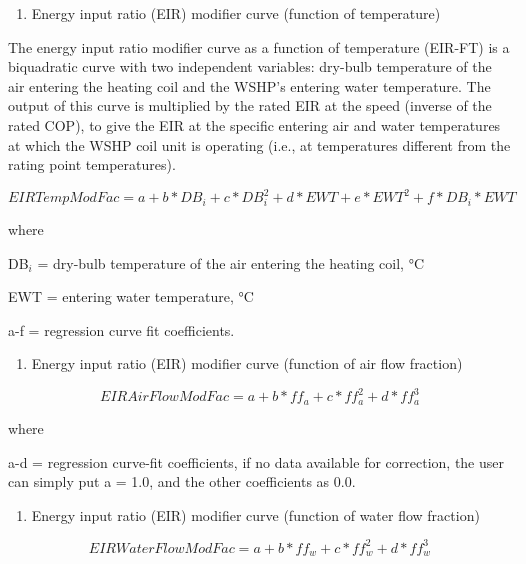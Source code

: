 \begin{enumerate}
\def\labelenumi{\arabic{enumi})}
\setcounter{enumi}{3}
\tightlist
\item
  Energy input ratio (EIR) modifier curve (function of temperature)
\end{enumerate}

The energy input ratio modifier curve as a function of temperature (EIR-FT) is a biquadratic curve with two independent variables: dry-bulb temperature of the air entering the heating coil and the WSHP's entering water temperature. The output of this curve is multiplied by the rated EIR at the speed (inverse of the rated COP), to give the EIR at the specific entering air and water temperatures at which the WSHP coil unit is operating (i.e., at temperatures different from the rating point temperatures).

\begin{equation}
EIRTempModFac = a + b*D{B_i} + c*DB_i^2 + d*EWT + e*EW{T^2} + f*D{B_i}*EWT
\end{equation}

where

DB\(_{i}\) = dry-bulb temperature of the air entering the heating coil, °C

EWT = entering water temperature, °C

a-f = regression curve fit coefficients.

\begin{enumerate}
\def\labelenumi{\arabic{enumi})}
\setcounter{enumi}{4}
\tightlist
\item
  Energy input ratio (EIR) modifier curve (function of air flow fraction)
\end{enumerate}

\begin{equation}
EIRAirFlowModFac = a + b*f{f_a} + c*ff_a^2 + d*ff_a^3
\end{equation}

where

a-d = regression curve-fit coefficients, if no data available for correction, the user can simply put a = 1.0, and the other coefficients as 0.0.

\begin{enumerate}
\def\labelenumi{\arabic{enumi})}
\setcounter{enumi}{5}
\tightlist
\item
  Energy input ratio (EIR) modifier curve (function of water flow fraction)
\end{enumerate}

\begin{equation}
EIRWaterFlowModFac = a + b*f{f_w} + c*ff_w^2 + d*ff_w^3
\end{equation}

